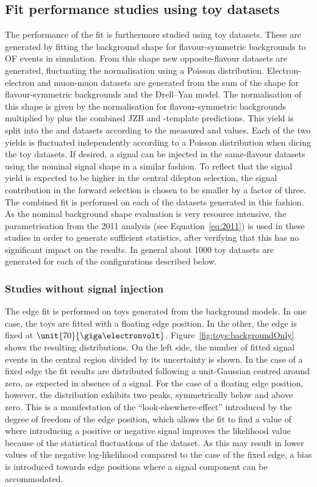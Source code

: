 \subsection{Fit performance studies using toy datasets}
\label{sec:toys}
The performance of the fit is furthermore studied using toy datasets. These are generated by fitting the background shape for flavour-symmetric backgrounds to OF events in simulation. From this shape new opposite-flavour datasets are generated, fluctuating the normalisation using a Poisson distribution. Electron-electron and muon-muon datasets are generated from the sum of the  shape for flavour-symmetric backgrounds and the Drell--Yan model. The normalisation of this shape is given by the normalisation for flavour-symmetric backgrounds multiplied by \Rsfof plus the combined JZB and \MET-template predictions. This yield is split into the \EE and \MM datasets according to the measured \Reeof and \Rmmof values. Each of the two yields is fluctuated independently according to a Poisson distribution when dicing the toy datasets. If desired, a signal can be injected in the same-flavour datasets using the nominal signal shape in a similar fashion. To reflect that the signal yield is expected to be higher in the central dilepton selection, the signal contribution in the forward selection is chosen to be smaller by a factor of three. The combined fit is performed on each of the datasets generated in this fashion. As the nominal background shape evaluation is very resource intensive, the parametrisation from the 2011 analysis (see Equation~\ref{eq:2011}) is used in these studies in order to generate sufficient statistics, after verifying that this has no significant impact on the results. In general about 1000 toy datasets are generated for each of the configurations described below.
\subsubsection{Studies without signal injection}
\label{sec:toysWO}
The edge fit is performed on toys generated from the background models. In one case, the toys are fitted with a floating edge position. In the other, the edge is fixed at $\unit{70}{\giga\electronvolt}$. Figure~\ref{fig:toys:backgroundOnly} shows the resulting distributions. On the left side, the number of fitted signal events in the central region divided by its uncertainty is shown. In the case of a fixed edge the fit results are distributed following a unit-Gaussian centred around zero, as expected in absence of a signal.  For the case of a floating edge position, however, the distribution exhibits two peaks, symmetrically below and above zero. This is a manifestation of the ``look-elsewhere-effect'' introduced by the degree of freedom of the edge position, which allows the fit to find a value of \mlledge where introducing a positive or negative signal improves the likelihood value because of the statistical fluctuations of the dataset. As this may result in lower values of the negative log-likelihood compared to the case of the fixed edge, a bias is introduced towards edge positions where a signal component can be accommodated.

